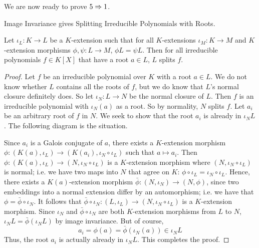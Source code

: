 \documentclass[../book.tex]{subfiles}
\begin{document}
We are now ready to prove $5 \Rightarrow 1$. 
\begin{thm} Image Invariance gives Splitting Irreducible Polynomials with Roots.
    
    Let $\iota_L : K \to L$ be a $K$-extension such that
    for all $K$-extensions $\iota_M : K \to M$ and 
    $K$-extension morphisms $\phi, \psi : L \to M$, $\phi L = \psi L$. 
    Then for all irreducible polynomials $f \in K[X]$ that have a root $a \in L$, 
    $L$ splits $f$. 
\end{thm}
\begin{proof}
    Let $f$ be an irreducible polynomial over $K$ with a root $a \in L$. 
    We do not know whether $L$ contains all the roots of $f$, 
    but we do know that $L$'s normal closure definitely does. 
    So let $\iota_N : L \to N$ be the normal closure of $L$. 
    Then $f$ is an irreducible polynomial with $\iota_N(a)$ as a root.
    So by normality, $N$ splits $f$. 
    Let $a_i$ be an arbitrary root of $f$ in $N$. 
    We seek to show that the root $a_i$ is already in $\iota_N L$. 
    The following diagram is the situation. 
    \begin{figure} [H]
        \centering
    \end{figure}
    Since $a_i$ is a Galois conjugate of $a$, 
    there exists a $K$-extension morphism 
    $\phi : (K(a),\iota_L) \to (K(a_i),\iota_N\circ\iota_L)$ 
    such that $a \mapsto a_i$. 
    Then $\phi : (K(a),\iota_L) \to (N,\iota_N\circ\iota_L)$
    is a $K$-extension morphism where $(N,\iota_N\circ\iota_L)$ is normal;
    i.e. we have two maps into $N$ that agree on 
    $K$: $\phi \circ \iota_L = \iota_N \circ \iota_L$.
    Hence, there exists a $K(a)$-extension morphism 
    $\bar\phi : (N,\iota_N) \to (N,\phi)$,
    since two embeddings into a normal extension differ by an automorphism;
    i.e. we have that $\phi = \bar\phi \circ \iota_N$.
    It follows that 
    $\bar\phi\circ\iota_N : (L,\iota_L) \to (N,\iota_N\circ\iota_L)$
    is a $K$-extension morphism. 
    Since $\iota_N$ and $\bar\phi\circ\iota_N$ are 
    both $K$-extension morphisms from $L$ to $N$,
    $\iota_N L = \bar\phi(\iota_N L)$ by image invariance.
    But of course, 
    \[ a_i = \phi(a) = \bar\phi(\iota_N(a)) \in \iota_N L\]
    Thus, the root $a_i$ is actually already in $\iota_N L$.
    This completes the proof. 
\end{proof}
\end{document}
